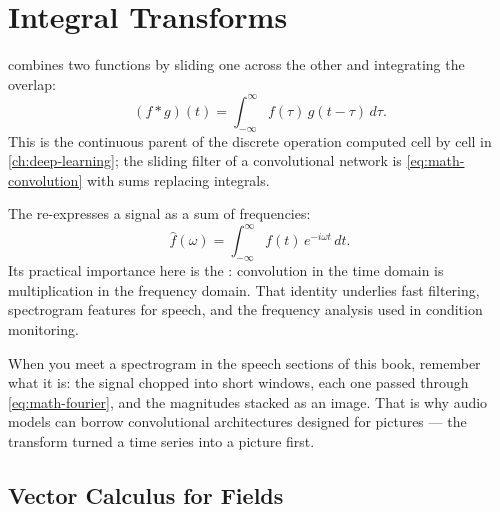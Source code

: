 \section{Integral Transforms}

 combines two functions by sliding one across the other
and integrating the overlap:
\begin{equation}
  (f * g)(t) = \int_{-\infty}^{\infty} f(\tau)\,g(t-\tau)\,d\tau .
  \label{eq:math-convolution}
\end{equation}
This is the continuous parent of the discrete operation computed cell by cell
in \cref{ch:deep-learning}; the sliding filter of a convolutional network is
\cref{eq:math-convolution} with sums replacing integrals.

The  re-expresses a signal as a sum of
frequencies:
\begin{equation}
  \hat f(\omega) = \int_{-\infty}^{\infty} f(t)\,e^{-i\omega t}\,dt .
  \label{eq:math-fourier}
\end{equation}
Its practical importance here is the : convolution
in the time domain is multiplication in the frequency domain. That identity
underlies fast filtering, spectrogram features for speech, and the frequency
analysis used in condition monitoring.

\begin{engineernote}
When you meet a spectrogram in the speech sections of this book, remember what
it is: the signal chopped into short windows, each one passed through
\cref{eq:math-fourier}, and the magnitudes stacked as an image. That is why
audio models can borrow convolutional architectures designed for pictures ---
the transform turned a time series into a picture first.
\end{engineernote}

\subsection{Vector Calculus for Fields}

